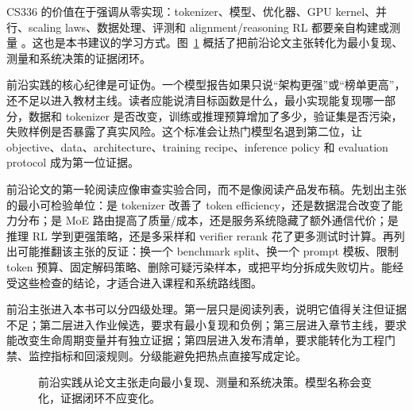 \documentclass[UTF8,zihao=-4,openany]{ctexbook}
\begin{document}
CS336 的价值在于强调从零实现：tokenizer、模型、优化器、GPU kernel、并行、scaling laws、数据处理、评测和 alignment/reasoning RL 都要亲自构建或测量 \cite{stanfordcs3362026}。这也是本书建议的学习方式。图~\ref{fig:zh-frontier-practice-loop} 概括了把前沿论文主张转化为最小复现、测量和系统决策的证据闭环。

前沿实践的核心纪律是可证伪。一个模型报告如果只说“架构更强”或“榜单更高”，还不足以进入教材主线。读者应能说清目标函数是什么，最小实现能复现哪一部分，数据和 tokenizer 是否改变，训练或推理预算增加了多少，验证集是否污染，失败样例是否暴露了真实风险。这个标准会让热门模型名退到第二位，让 objective、data、architecture、training recipe、inference policy 和 evaluation protocol 成为第一位证据。

前沿论文的第一轮阅读应像审查实验合同，而不是像阅读产品发布稿。先划出主张的最小可检验单位：是 tokenizer 改善了 token efficiency，还是数据混合改变了能力分布；是 MoE 路由提高了质量/成本，还是服务系统隐藏了额外通信代价；是推理 RL 学到更强策略，还是多采样和 verifier rerank 花了更多测试时计算。再列出可能推翻该主张的反证：换一个 benchmark split、换一个 prompt 模板、限制 token 预算、固定解码策略、删除可疑污染样本，或把平均分拆成失败切片。能经受这些检查的结论，才适合进入课程和系统路线图。

前沿主张进入本书可以分四级处理。第一层只是阅读列表，说明它值得关注但证据不足；第二层进入作业候选，要求有最小复现和负例；第三层进入章节主线，要求能改变生命周期变量并有独立证据；第四层进入发布清单，要求能转化为工程门禁、监控指标和回滚规则。分级能避免把热点直接写成定论。

\begin{figure}[t]
\centering
{}
\caption{前沿实践从论文主张走向最小复现、测量和系统决策。模型名称会变化，证据闭环不应变化。}
\label{fig:zh-frontier-practice-loop}
\end{figure}
\end{document}

